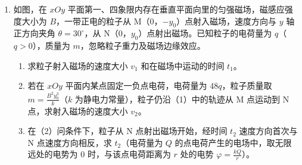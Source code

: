 \documentclass[\gkver]{gaokaozhenti}
\begin{document}
\begin{enumerate}
\item
如图，在 $xOy$ 平面第一、四象限内存在垂直平面向里的匀强磁场，磁感应强度大小为 $B$，一带正电的粒子从 M（0，$-y_{0}$）点射入磁场，速度方向与 $y$ 轴正方向夹角 $\theta = 30^\circ$，从 N（0，$y_{0}$）点射出磁场。已知粒子的电荷量为 $q$（$q > 0$），质量为 $m$，忽略粒子重力及磁场边缘效应。
\begin{enumerate}
\item
求粒子射入磁场的速度大小 $v_{1}$ 和在磁场中运动的时间 $t_{1}$。
\item
若在 $xOy$ 平面内某点固定一负点电荷，电荷量为 $48q$，粒子质量取 $m = \frac{B^{2}y_{0}^{3}}{k}$（$k$ 为静电力常量），粒子仍沿（1）中的轨迹从 M 点运动到 N 点，求射入磁场的速度大小 $v_{2}$。
\item
在（2）问条件下，粒子从 N 点射出磁场开始，经时间 $t_{2}$ 速度方向首次与 N 点速度方向相反，求 $t_{2}$（电荷量为 $Q$ 的点电荷产生的电场中，取无限远处的电势为 0 时，与该点电荷距离为 $r$ 处的电势 $\varphi = \frac{kQ}{r}$）。
\end{enumerate}


\end{enumerate}
\end{document}

